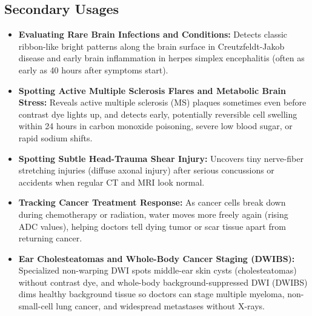 \subsection{Secondary Usages}
\begin{itemize}
\item \textbf{Evaluating Rare Brain Infections and Conditions:} Detects classic ribbon-like bright patterns along the brain surface in Creutzfeldt-Jakob disease and early brain inflammation in herpes simplex encephalitis (often as early as 40 hours after symptoms start).
\item \textbf{Spotting Active Multiple Sclerosis Flares and Metabolic Brain Stress:} Reveals active multiple sclerosis (MS) plaques sometimes even before contrast dye lights up, and detects early, potentially reversible cell swelling within 24 hours in carbon monoxide poisoning, severe low blood sugar, or rapid sodium shifts.
\item \textbf{Spotting Subtle Head-Trauma Shear Injury:} Uncovers tiny nerve-fiber stretching injuries (diffuse axonal injury) after serious concussions or accidents when regular CT and MRI look normal.
\item \textbf{Tracking Cancer Treatment Response:} As cancer cells break down during chemotherapy or radiation, water moves more freely again (rising ADC values), helping doctors tell dying tumor or scar tissue apart from returning cancer.
\item \textbf{Ear Cholesteatomas and Whole-Body Cancer Staging (DWIBS):} Specialized non-warping DWI spots middle-ear skin cysts (cholesteatomas) without contrast dye, and whole-body background-suppressed DWI (DWIBS) dims healthy background tissue so doctors can stage multiple myeloma, non-small-cell lung cancer, and widespread metastases without X-rays.
\end{itemize}

